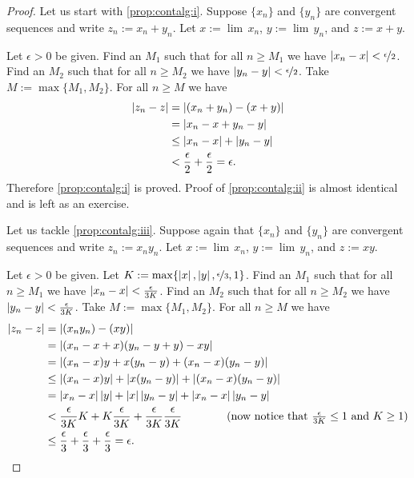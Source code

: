 \begin{proof}
Let us start with \ref{prop:contalg:i}.
Suppose $\{ x_n \}$ and $\{ y_n \}$ are convergent sequences and
write $z_n := x_n + y_n$.  Let $x := \lim\, x_n$,
$y := \lim\, y_n$, and $z := x+y$.

Let $\epsilon > 0$ be given.  
Find an $M_1$ such that for all $n \geq M_1$
we have
$\left\lvert {x_n - x} \right\rvert < \nicefrac{\epsilon}{2}$.  
Find an $M_2$ such that for all $n \geq M_2$
we have
$\left\lvert {y_n - y} \right\rvert < \nicefrac{\epsilon}{2}$.  Take $M := \max \{ M_1, M_2 \}$.
For all $n \geq M$ we have
\begin{equation*}
\begin{split}
\left\lvert {z_n - z} \right\rvert &=
\left\lvert {(x_n+y_n) - (x+y)} \right\rvert \\
& =
\left\lvert {x_n-x + y_n-y} \right\rvert \\
& \leq
\left\lvert {x_n-x} \right\rvert + \left\lvert {y_n-y} \right\rvert \\
& <
\frac{\epsilon}{2} +
\frac{\epsilon}{2}
= \epsilon.
\end{split}
\end{equation*}
Therefore \ref{prop:contalg:i} is proved.
Proof of \ref{prop:contalg:ii} is almost identical and is left as an
exercise.

Let us tackle 
\ref{prop:contalg:iii}.
Suppose again that $\{ x_n \}$ and $\{ y_n \}$ are convergent sequences and
write $z_n := x_n y_n$.  Let $x := \lim\, x_n$,
$y := \lim\, y_n$, and $z := xy$.

Let $\epsilon > 0$ be given.
Let $K := \max\{ \left\lvert {x} \right\rvert, \left\lvert {y} \right\rvert, \nicefrac{\epsilon}{3} , 1 \}$.
Find an $M_1$ such that for all $n \geq M_1$
we have
$\left\lvert {x_n - x} \right\rvert < \frac{\epsilon}{3K}$.
Find an $M_2$ such that for all $n \geq M_2$
we have
$\left\lvert {y_n - y} \right\rvert < \frac{\epsilon}{3K}$.  Take $M := \max \{ M_1, M_2 \}$.
For all $n \geq M$ we have
\begin{equation*}
\begin{split}
\left\lvert {z_n - z} \right\rvert &=
\left\lvert {(x_ny_n) - (xy)} \right\rvert \\
& =
\left\lvert {(x_n-x+x)(y_n-y+y) - xy} \right\rvert \\
& =
\left\lvert {(x_n-x)y + x(y_n-y) +(x_n-x)(y_n-y)} \right\rvert \\
& \leq
\left\lvert {(x_n-x)y} \right\rvert + \left\lvert {x(y_n - y)} \right\rvert +
\left\lvert {(x_n-x)(y_n-y)} \right\rvert \\
& =
\left\lvert {x_n -x} \right\rvert\left\lvert {y} \right\rvert + 
\left\lvert {x} \right\rvert\left\lvert {y_n -y} \right\rvert + 
\left\lvert {x_n -x} \right\rvert\left\lvert {y_n -y} \right\rvert
\\
& <
\frac{\epsilon}{3K} K + 
K \frac{\epsilon}{3K} + 
\frac{\epsilon}{3K}
\frac{\epsilon}{3K}
\qquad \qquad \text{(now notice that } \tfrac{\epsilon}{3K} \leq 1
\text{ and }
K \geq 1\text{)}
\\
& \leq
\frac{\epsilon}{3} + \frac{\epsilon}{3} + \frac{\epsilon}{3}
 = \epsilon .
\end{split}
\end{equation*}


\end{proof}

